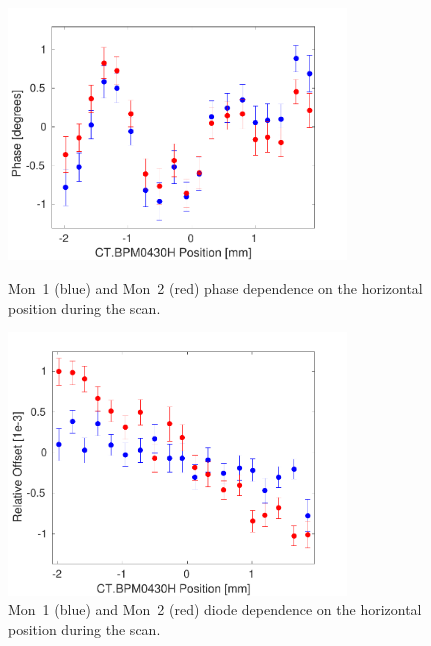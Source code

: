 \begin{figure}
  \centering
  \includegraphics[width=0.8\textwidth]{Figures/phaseMons/horizontalPosScan}
  \caption{Mon~1 (blue) and Mon~2 (red) phase dependence on the horizontal position during the scan.}
  \label{f:horizontalPosScan}
  \includegraphics[width=0.8\textwidth]{Figures/phaseMons/horizontalScanDiode}
  \caption{Mon~1 (blue) and Mon~2 (red) diode dependence on the horizontal position during the scan.}
  \label{f:horizontalScanDiode}
\end{figure}

